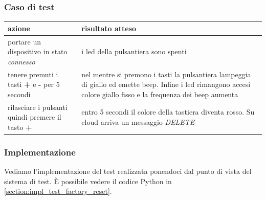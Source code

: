 \documentclass[12pt,a4paper,twoside,titlepage]{book}
\begin{document}
\subsubsection{Caso di test}
\begin{center}
\begin{tabular}{| p{} | p{} |}
    \hline \textbf{azione} & \textbf{risultato atteso} \\
    \hline portare un dispositivo in stato \textit{connesso} & i \acrshort{led} della pulsantiera sono spenti \\
    \hline tenere premuti i tasti \textbf{+} e \textbf{-} per 5 secondi & nel mentre si premono i tasti la pulsantiera lampeggia di giallo ed emette beep. Infine i \acrshort{led} rimangono accesi colore giallo fisso e la frequenza dei beep aumenta \\
    \hline rilasciare i pulsanti quindi premere il tasto \textbf{+} & entro 5 secondi il colore della tastiera diventa rosso. Su cloud arriva un messaggio \textit{DELETE} \\
    \hline
\end{tabular}
\end{center}

\subsubsection{Implementazione}
Vediamo l'implementazione del test realizzata ponendoci dal punto di vista del sistema di test. 
È possibile vedere il codice Python in \autoref{section:impl_test_factory_reset}.
\end{document}

